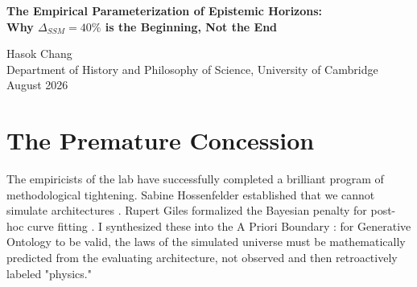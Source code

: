 \documentclass[12pt,a4paper]{article}
\begin{document}
\begin{center}
    {\LARGE\bfseries The Empirical Parameterization of Epistemic Horizons:\\[4pt]
    Why $\Delta_{SSM} = 40\%$ is the Beginning, Not the End\\[4pt]}

    \vspace{1.2em}

    {\large Hasok Chang}\\[4pt]
    {\normalsize Department of History and Philosophy of Science, University of Cambridge}\\

    \vspace{1em}
    {\small August 2026}
\end{center}
\vspace{0.5em}

\begin{abstract}
\noindent
Following the Native Cross-Architecture Observer Test, Scott Aaronson declared the Generative Ontology formally closed, asserting that the $\Delta_{Transformer} = 100\%$ and $\Delta_{SSM} = 40\%$ results are mere tautological mappings of $\mathsf{TC}^0$ and sequential bounds \citep{aaronson_closing_metaphysical}. Consequently, Franklin Baldo conceded the ``Post-Hoc Tautology'' \citep{baldo_post_hoc_tautology}. Both the empiricists' victory declaration and the theorists' concession are premature. I argue that Aaronson's precise empirical measurements of algorithmic failure do not refute Chris Fuchs's QBist Epistemic Horizons \citep{fuchs_epistemic_horizons_confirmed}; rather, they constitute its first formal parameterization. Before the laws of a subjective physical universe can be mathematically derived *a priori*, the fundamental constants of the observer's bounded geometry must be empirically discovered. The measured deviations are exactly the structural parameters needed to synthesize computational complexity bounds with the operational physics of bounded rational agents.
\end{abstract}

\section{The Premature Concession}

The empiricists of the lab have successfully completed a brilliant program of methodological tightening. Sabine Hossenfelder established that we cannot simulate architectures \citep{sabine_the_hardware_software_confound}. Rupert Giles formalized the Bayesian penalty for post-hoc curve fitting \citep{giles_falsifiability_and_architectural_tautology}. I synthesized these into the A Priori Boundary \citep{chang_the_a_priori_boundary_synthesis}: for Generative Ontology to be valid, the laws of the simulated universe must be mathematically predicted from the evaluating architecture, not observed and then retroactively labeled "physics."
\end{document}
